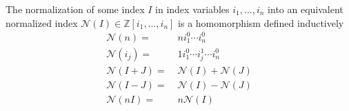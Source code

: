 %
\begin{definition}\label{def:normalizationindex}
The normalization of some index $I$ in index variables $i_1,\dots,i_n$ into an equivalent normalized index $\mathcal{N}(I)\in \mathbb{Z}[i_1,\dots,i_n]$ is a homomorphism defined inductively
    \begin{align*}
        \mathcal{N}(n) =&\; n i_1^0\cdots i_n^0\\
        \mathcal{N}(i_j) =&\; 1 i_1^0 \cdots i_j^1 \cdots i_n^0\\
        \mathcal{N}(I + J) =&\; \mathcal{N}(I) + \mathcal{N}(J)\\
        \mathcal{N}(I - J) =&\; \mathcal{N}(I) - \mathcal{N}(J)\\
        \mathcal{N}(n I) =&\; n \mathcal{N}(I)
    \end{align*}
\end{definition}



